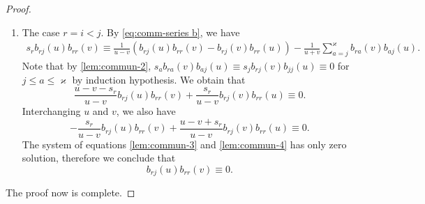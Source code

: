 \documentclass[11pt,reqno]{amsart}
\numberwithin{equation}{section}
\theoremstyle{definition}
\theoremstyle{remark}
\newcommand{\beq}{\begin{equation}}
\newcommand{\eeq}{\end{equation}}
\newcommand{\lle}{\leqslant}
\newcommand{\ka}{\varkappa}
\begin{document}
\begin{proof}
\begin{enumerate}
\item The case $r=i<j$. By \eqref{eq:comm-series b}, we have
\begin{align*}
s_rb_{rj}(u)b_{rr}(v)\equiv \frac{1}{u-v}(b_{rj}(u)b_{rr}(v)-b_{rj}(v)b_{rr}(u))-\frac{1}{u+v}\sum_{a=j}^\ka b_{ra}(v)b_{aj}(u).
\end{align*}
Note that by \eqref{lem:commun-2}, $s_a b_{ra}(v)b_{aj}(u)\equiv s_j b_{rj}(v)b_{jj}(u)\equiv 0$ for $j\lle a\lle \ka$ by induction hypothesis. We obtain that
\beq\label{lem:commun-3}
\frac{u-v-s_r}{u-v} b_{rj}(u)b_{rr}(v)+\frac{s_r}{u-v}b_{rj}(v)b_{rr}(u)\equiv 0.
\eeq
Interchanging $u$ and $v$, we also have
\beq\label{lem:commun-4}
-\frac{s_r}{u-v} b_{rj}(u)b_{rr}(v)+\frac{u-v+s_r}{u-v}b_{rj}(v)b_{rr}(u)\equiv 0.
\eeq
The system of equations \eqref{lem:commun-3} and \eqref{lem:commun-4} has only zero solution, therefore we conclude that $$b_{rj}(u)b_{rr}(v)\equiv 0.$$
\end{enumerate}
The proof now is complete.
\end{proof}
\end{document}
